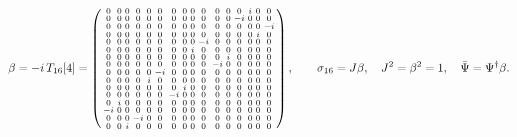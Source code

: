 \[ \beta = -i\,T_{16}[4] = \setcounter{MaxMatrixCols}{16}
\left(\begin{smallmatrix}
0 & 0 & 0 & 0 & 0 & 0 & 0 & 0 & 0 & 0 & 0 & 0 & 0 & i & 0 & 0 \\
0 & 0 & 0 & 0 & 0 & 0 & 0 & 0 & 0 & 0 & 0 & 0 & -i & 0 & 0 & 0 \\
0 & 0 & 0 & 0 & 0 & 0 & 0 & 0 & 0 & 0 & 0 & 0 & 0 & 0 & 0 & -i \\
0 & 0 & 0 & 0 & 0 & 0 & 0 & 0 & 0 & 0 & 0 & 0 & 0 & 0 & i & 0 \\
0 & 0 & 0 & 0 & 0 & 0 & 0 & 0 & 0 & -i & 0 & 0 & 0 & 0 & 0 & 0 \\
0 & 0 & 0 & 0 & 0 & 0 & 0 & 0 & i & 0 & 0 & 0 & 0 & 0 & 0 & 0 \\
0 & 0 & 0 & 0 & 0 & 0 & 0 & 0 & 0 & 0 & 0 & i & 0 & 0 & 0 & 0 \\
0 & 0 & 0 & 0 & 0 & 0 & 0 & 0 & 0 & 0 & -i & 0 & 0 & 0 & 0 & 0 \\
0 & 0 & 0 & 0 & 0 & -i & 0 & 0 & 0 & 0 & 0 & 0 & 0 & 0 & 0 & 0 \\
0 & 0 & 0 & 0 & i & 0 & 0 & 0 & 0 & 0 & 0 & 0 & 0 & 0 & 0 & 0 \\
0 & 0 & 0 & 0 & 0 & 0 & 0 & i & 0 & 0 & 0 & 0 & 0 & 0 & 0 & 0 \\
0 & 0 & 0 & 0 & 0 & 0 & -i & 0 & 0 & 0 & 0 & 0 & 0 & 0 & 0 & 0 \\
0 & i & 0 & 0 & 0 & 0 & 0 & 0 & 0 & 0 & 0 & 0 & 0 & 0 & 0 & 0 \\
-i & 0 & 0 & 0 & 0 & 0 & 0 & 0 & 0 & 0 & 0 & 0 & 0 & 0 & 0 & 0 \\
0 & 0 & 0 & -i & 0 & 0 & 0 & 0 & 0 & 0 & 0 & 0 & 0 & 0 & 0 & 0 \\
0 & 0 & i & 0 & 0 & 0 & 0 & 0 & 0 & 0 & 0 & 0 & 0 & 0 & 0 & 0
\end{smallmatrix}\right), \qquad \sigma_{16} = J\beta, \quad J^2=\beta^2=1, \quad \bar\Psi = \Psi^\dagger\beta . \]
